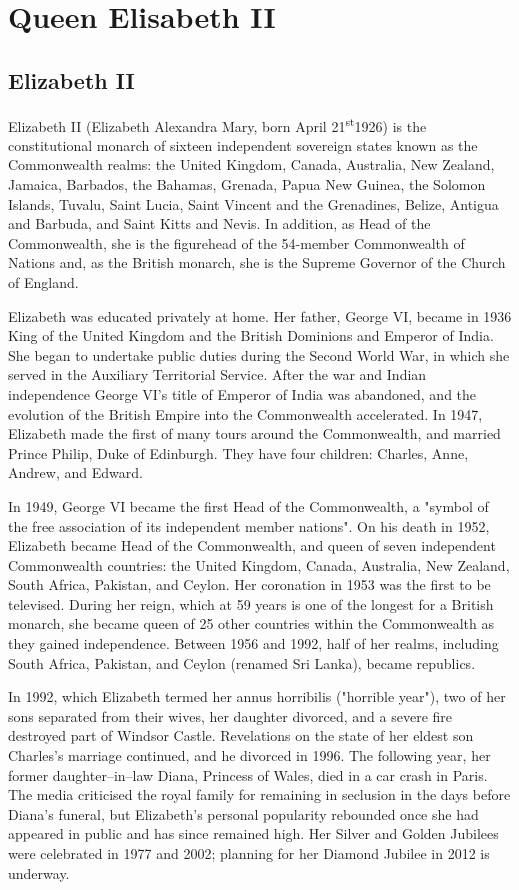 \documentclass[11pt;a4paper]{article}
\newcommand{\st}[0]{\textsuperscript{st}}
\begin{document}
\section*{Queen Elisabeth II}

\subsection*{Elizabeth II}

Elizabeth II (Elizabeth Alexandra Mary, born April 21\st 1926) is the constitutional monarch of sixteen independent sovereign states known as the Commonwealth realms: the United Kingdom, Canada, Australia, New Zealand, Jamaica, Barbados, the Bahamas, Grenada, Papua New Guinea, the Solomon Islands, Tuvalu, Saint Lucia, Saint Vincent and the Grenadines, Belize, Antigua and Barbuda, and Saint Kitts and Nevis. In addition, as Head of the Commonwealth, she is the figurehead of the 54-member Commonwealth of Nations and, as the British monarch, she is the Supreme Governor of the Church of England.

Elizabeth was educated privately at home. Her father, George VI, became in 1936 King of the United Kingdom and the British Dominions and Emperor of India. She began to undertake public duties during the Second World War, in which she served in the Auxiliary Territorial Service. After the war and Indian independence George VI's title of Emperor of India was abandoned, and the evolution of the British Empire into the Commonwealth accelerated. In 1947, Elizabeth made the first of many tours around the Commonwealth, and married Prince Philip, Duke of Edinburgh. They have four children: Charles, Anne, Andrew, and Edward.

In 1949, George VI became the first Head of the Commonwealth, a "symbol of the free association of its independent member nations". On his death in 1952, Elizabeth became Head of the Commonwealth, and queen of seven independent Commonwealth countries: the United Kingdom, Canada, Australia, New Zealand, South Africa, Pakistan, and Ceylon. Her coronation in 1953 was the first to be televised. During her reign, which at 59 years is one of the longest for a British monarch, she became queen of 25 other countries within the Commonwealth as they gained independence. Between 1956 and 1992, half of her realms, including South Africa, Pakistan, and Ceylon (renamed Sri Lanka), became republics.

In 1992, which Elizabeth termed her annus horribilis ("horrible year"), two of her sons separated from their wives, her daughter divorced, and a severe fire destroyed part of Windsor Castle. Revelations on the state of her eldest son Charles's marriage continued, and he divorced in 1996. The following year, her former daughter--in--law Diana, Princess of Wales, died in a car crash in Paris. The media criticised the royal family for remaining in seclusion in the days before Diana's funeral, but Elizabeth's personal popularity rebounded once she had appeared in public and has since remained high. Her Silver and Golden Jubilees were celebrated in 1977 and 2002; planning for her Diamond Jubilee in 2012 is underway.
\end{document}
